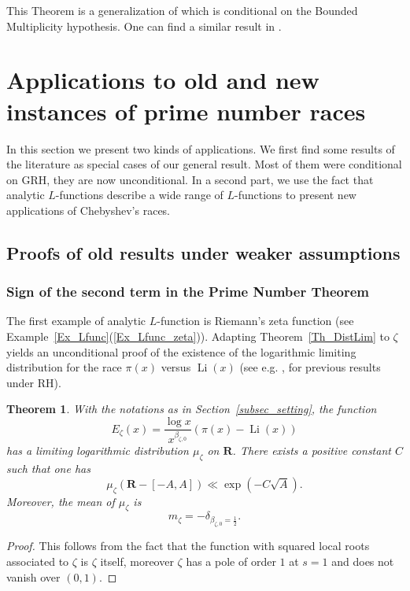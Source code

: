 \documentclass[a4paper,10pt]{amsart}
\theoremstyle{plain}
\newtheorem{theo}{Theorem}[section]
\theoremstyle{definition}
\begin{document}
This Theorem is a generalization of \cite[Th. 1.2]{FioEC} which is conditional on the Bounded Multiplicity hypothesis.
One can find a similar result in \cite[Th. 1.2]{Fiorilli_HighlyBiased}.

\section{Applications to old and new instances of prime number races}\label{Sec_Applications}

In this section we present two kinds of applications.
We first find some results of the literature as special cases of our general result.
Most of them were conditional on GRH, they are now unconditional.
In a second part, we use the fact that analytic $L$-functions describe a wide range of $L$-functions to present new applications of Chebyshev's races.

\subsection{Proofs of old results under weaker assumptions}

\subsubsection{Sign of the second term in the Prime Number Theorem}

The first example of analytic $L$-function is Riemann's zeta function (see Example~\ref{Ex_Lfunc}(\ref{Ex_Lfunc_zeta})).
Adapting Theorem~\ref{Th_DistLim} to $\zeta$ yields an unconditional proof of the existence of the logarithmic limiting distribution for the race $\pi(x)$ versus $\operatorname{Li}(x)$ (see e.g. \cite{Wintner}, \cite[p. 175]{RS} for previous results under RH).
\begin{theo}\label{Th_race_pi_Li}
With the notations as in Section~\ref{subsec_setting},
the function 
$$E_{\zeta}(x) = \frac{\log x}{x^{\beta_{\zeta,0}}}(\pi(x) -\operatorname{Li}(x))$$
has a limiting logarithmic distribution $\mu_{\zeta}$ on $\mathbf{R}$.
There exists a positive constant $C$ such that one has 
$$\mu_{\zeta}(\mathbf{R}-[-A,A]) \ll \exp(-C\sqrt{A}).$$
Moreover, the mean of $\mu_{\zeta}$ is 
$$m_{\zeta} = -\delta_{\beta_{\zeta,0} = \frac{1}{2}}.$$
\end{theo}

\begin{proof}
This follows from the fact that the function with squared local roots associated to $\zeta$ is $\zeta$ itself, 
moreover $\zeta$ has a pole of order $1$ at $s=1$ and does not vanish over $(0,1)$.
\end{proof}
\end{document}
